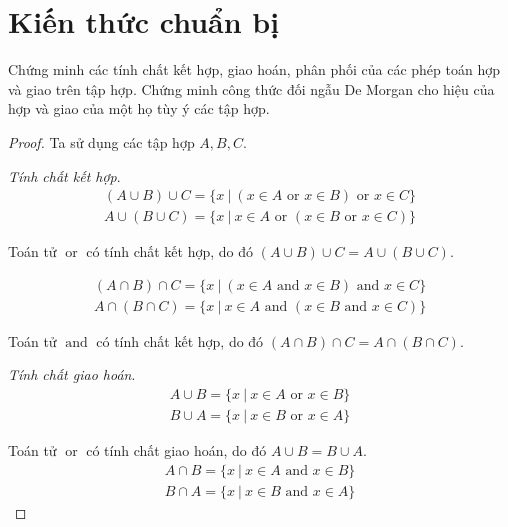 \chapter{Kiến thức chuẩn bị}

\setcounter{exercise}{0}

\begin{exercise}Chứng minh các tính chất kết hợp, giao hoán, phân phối của các phép toán hợp và giao trên tập hợp. Chứng minh công thức đối ngẫu De Morgan cho hiệu của hợp và giao của một họ tùy ý các tập hợp.
\end{exercise}

\begin{proof}
    Ta sử dụng các tập hợp $A, B, C$.

    \textit{Tính chất kết hợp}.
    \begin{gather*}
        (A\cup B)\cup C = \{ x\ |\ (x\in A \text{ or } x\in B) \text{ or } x\in C \} \\
        A\cup (B\cup C) = \{ x\ |\ x\in A \text{ or } (x\in B \text{ or } x\in C) \}
    \end{gather*}

    Toán tử $\operatorname{or}$ có tính chất kết hợp, do đó $(A\cup B)\cup C = A\cup (B\cup C)$.

    \begin{gather*}
        (A\cap B)\cap C = \{ x\ |\ (x\in A \text{ and } x\in B) \text{ and } x\in C \} \\
        A\cap (B\cap C) = \{ x\ |\ x\in A \text{ and } (x\in B \text{ and } x\in C) \}
    \end{gather*}

    Toán tử $\operatorname{and}$ có tính chất kết hợp, do đó $(A\cap B)\cap C = A\cap (B\cap C)$.

    \bigskip

    \textit{Tính chất giao hoán}.
    \begin{gather*}
        A\cup B = \{ x\ |\ x\in A \text{ or } x\in B \} \\
        B\cup A = \{ x\ |\ x\in B \text{ or } x\in A \}
    \end{gather*}

    Toán tử $\operatorname{or}$ có tính chất giao hoán, do đó $A\cup B = B\cup A$.
    \begin{gather*}
        A\cap B = \{ x\ |\ x\in A \text{ and } x\in B \} \\
        B\cap A = \{ x\ |\ x\in B \text{ and } x\in A \}
    \end{gather*}


\end{proof}
